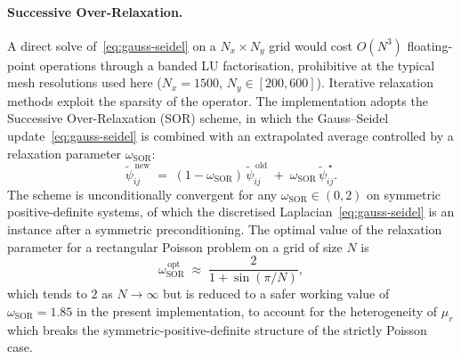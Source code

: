 \paragraph{Successive Over-Relaxation.}
A direct solve of~\eqref{eq:gauss-seidel} on a $N_x\times N_y$ grid would cost $O(N^{3})$ floating-point operations through a banded LU factorisation, prohibitive at the typical mesh resolutions used here ($N_x = 1500$, $N_y \in [200, 600]$).
Iterative relaxation methods exploit the sparsity of the operator. The implementation adopts the Successive Over-Relaxation (SOR) scheme, in which the Gauss--Seidel update~\eqref{eq:gauss-seidel} is combined with an extrapolated average controlled by a relaxation parameter $\omega_{\mathrm{SOR}}$:
\begin{equation}
\tilde{\psi}_{ij}^{\,\mathrm{new}}
\;=\; (1 - \omega_{\mathrm{SOR}})\,\tilde{\psi}_{ij}^{\,\mathrm{old}} \;+\; \omega_{\mathrm{SOR}}\,\tilde{\psi}_{ij}^{\,\star}.
\label{eq:sor-update}
\end{equation}
The scheme is unconditionally convergent for any $\omega_{\mathrm{SOR}} \in (0, 2)$ on symmetric positive-definite systems, of which the discretised Laplacian~\eqref{eq:gauss-seidel} is an instance after a symmetric preconditioning.
The optimal value of the relaxation parameter for a rectangular Poisson problem on a grid of size $N$ is
\begin{equation}
\omega_{\mathrm{SOR}}^{\,\mathrm{opt}}
\;\approx\; \frac{2}{1 + \sin(\pi/N)},
\label{eq:omega-opt}
\end{equation}
which tends to $2$ as $N\to\infty$ but is reduced to a safer working value of $\omega_{\mathrm{SOR}} = 1.85$ in the present implementation, to account for the heterogeneity of $\mu_r$ which breaks the symmetric-positive-definite structure of the strictly Poisson case.

